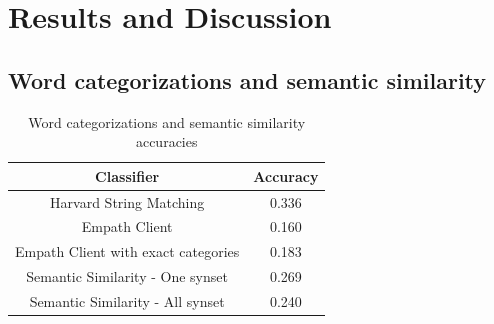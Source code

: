 \documentclass[conference]{IEEEtran}
\begin{document}
\section{Results and Discussion}

\subsection{Word categorizations and semantic similarity}

\begin{table}[htbp]
\caption{Word categorizations and semantic similarity accuracies}
\begin{center}
\begin{tabular}{|c|c|}
\hline
\textbf{Classifier}&\multicolumn{1}{|c|}{\textbf{Accuracy}} \\ 

\hline
Harvard String Matching & 0.336 \\ 
\hline
Empath Client & 0.160 \\ 
\hline
Empath Client with exact categories & 0.183 \\ 
\hline
Semantic Similarity - One synset & 0.269 \\ 
\hline
Semantic Similarity - All synset & 0.240 \\ 
\hline
\end{tabular}
\label{tab1}
\end{center}
\end{table}
\end{document}
